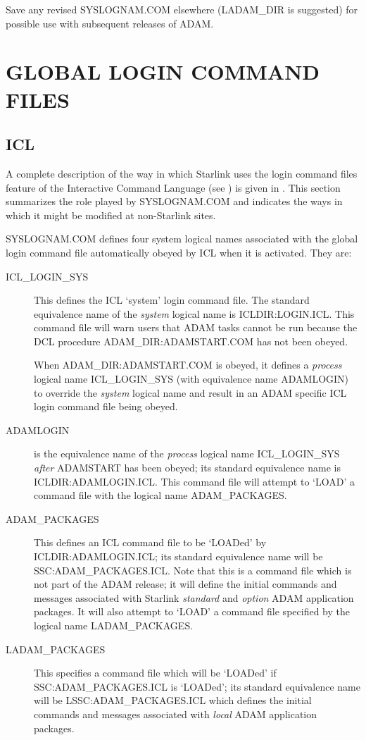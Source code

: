 Save any revised SYSLOGNAM.COM elsewhere (LADAM\_DIR is suggested) for
possible use with subsequent releases of ADAM.


\section{GLOBAL LOGIN COMMAND FILES}
\subsection{ICL}
\label{adampacks}
A complete description of the way in which Starlink uses the login command
files feature of the Interactive Command Language (see \cite{icl}) is given in 
\cite{ssn64}.
This section summarizes the role played by SYS\-LOGNAM\-.COM and indicates
the ways in which it might be modified at non-Starlink sites.

SYSLOGNAM.COM defines four system logical names associated with the global
login command file automatically obeyed by ICL when it is activated.
They are:
\begin{description}
\item[ICL\_LOGIN\_SYS] This defines the ICL `system' login command file.
The standard equivalence name of the {\em system} logical name is 
ICLDIR:\-LOGIN\-.ICL.
This command file will warn users that ADAM tasks cannot be run because
the DCL procedure ADAM\_DIR:\-ADAM\-START\-.COM has not been obeyed. 

When ADAM\_DIR:\-ADAM\-START\-.COM is obeyed, it defines a {\em process}
logical name ICL\-\_LOGIN\-\_SYS (with equivalence name ADAMLOGIN) to override
the {\em system} logical name and result in an ADAM specific ICL login command
file being obeyed.
\item[ADAMLOGIN] is the equivalence name of the {\em process} logical name
ICL\_LOGIN\_SYS {\em after} ADAM\-START has been obeyed; its standard 
equivalence name is ICL\-DIR:\-ADAM\-LOGIN\-.ICL.
This command file will attempt to `LOAD' a command file with the logical name 
ADAM\-\_PACKAGES.
\item[ADAM\_PACKAGES] This defines an ICL command file to be `LOADed' by
ICL\-DIR:\-ADAM\-LOGIN\-.ICL; its standard equivalence name will be 
SSC:\-ADAM\-\_PACK\-AGES\-.ICL.
Note that this is a command file which is not part of the ADAM
release; it will define the initial commands and messages associated with 
Starlink {\em standard}\/ and {\em option}\/ ADAM application  packages.
It will also attempt to `LOAD' a command file specified by the logical name
LADAM\-\_PACKAGES.
\item[LADAM\_PACKAGES] This specifies a command file which will be `LOADed'
if SSC:\-ADAM\-\_PACK\-AGES\-.ICL is `LOADed'; its standard equivalence name 
will be LSSC:\-ADAM\-\_PACK\-AGES\-.ICL which defines the initial commands and 
messages associated with {\em local}\/ ADAM application packages.
\end{description}

